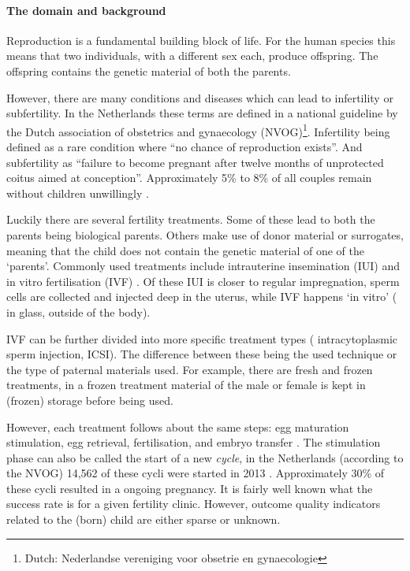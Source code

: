 \paragraph{The domain and background}
Reproduction is a fundamental building block of life.
For the human species this means that two individuals, with a different sex each, produce offspring.
The offspring contains the genetic material of both the parents.

However, there are many conditions and diseases which can lead to infertility or subfertility.
In the Netherlands these terms are defined in a national guideline by the Dutch association of obstetrics and gynaecology (NVOG)\footnote{Dutch: Nederlandse vereniging voor obsetrie en gynaecologie}\cite{subfertilityGuideline}.
Infertility being defined as a rare condition where ``no chance of reproduction exists''.
And subfertility as ``failure to become pregnant after twelve months of unprotected coitus aimed at conception''.
Approximately 5\% to 8\% of all couples remain without children unwillingly \cite{cbsStatistics, nhgStatistics}.

Luckily there are several fertility treatments.
Some of these lead to both the parents being biological parents. 
Others make use of donor material or surrogates, meaning that the child does not contain the genetic material of one of the `parents'.
Commonly used treatments include intrauterine insemination (IUI) and in vitro fertilisation (IVF) \cite{treatmentExplanation}.
Of these IUI is closer to regular impregnation, sperm cells are collected and injected deep in the uterus, while IVF happens `in vitro' (\ie{} in glass, outside of the body).

IVF can be further divided into more specific treatment types (\eg{} intracytoplasmic sperm injection, ICSI).
The difference between these being the used technique or the type of paternal materials used.
For example, there are fresh and frozen treatments, in a frozen treatment material of the male or female is kept in (frozen) storage before being used.

However, each treatment follows about the same steps: egg maturation stimulation, egg retrieval, fertilisation, and embryo transfer \cite{treatmentExplanation}.
The stimulation phase can also be called the start of a new \emph{cycle}, in the Netherlands (according to the NVOG) 14,562 of these cycli were started in 2013 \cite{ivfReportNVOG2013}.
Approximately 30\% of these cycli resulted in a ongoing pregnancy.
It is fairly well known what the success rate is for a given fertility clinic.
However, outcome quality indicators related to the (born) child are either sparse or unknown.

